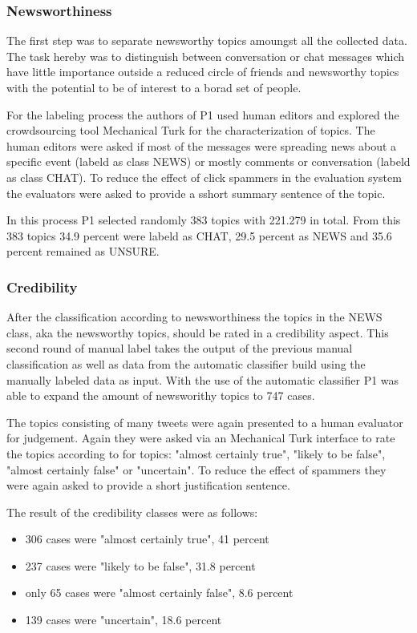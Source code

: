 \documentclass{proseminar}
\begin{document}
\subsubsection*{Newsworthiness}
The first step was to  separate newsworthy topics amoungst all the collected data. The task hereby was to distinguish between conversation or chat messages which have little importance outside a reduced circle of friends and newsworthy topics with the potential to be of interest to a borad set of people.

For the labeling process the authors of P1 used human editors and explored the crowdsourcing tool Mechanical Turk for the characterization of topics.
The human editors were asked if most of the messages were spreading news about a specific event (labeld as class NEWS) or mostly comments or conversation (labeld as class CHAT). To  reduce the effect of click spammers in the evaluation system the evaluators were asked to provide a sshort summary sentence of the topic.

In this process P1 selected randomly 383 topics with 221.279 in total. From this 383 topics 34.9 percent were labeld as CHAT, 29.5 percent as NEWS and 35.6 percent remained as UNSURE.


\subsubsection*{Credibility}
After the classification according to newsworthiness the topics in the NEWS class, aka the newsworthy topics, should be rated in a credibility aspect.
This second round of manual label takes the output of the previous manual classification as well as data from the automatic classifier build using the manually labeled data as input. With the use of the automatic classifier P1 was able to expand the amount of newsworithy topics to 747 cases.

The topics consisting of many tweets were again presented to a human evaluator for judgement. Again they were asked via an Mechanical Turk interface to rate the topics according to for topics: "almost certainly true", "likely to be false", "almost certainly false" or "uncertain". To reduce the effect of spammers they were again asked to provide a short justification sentence. 

The result of the credibility classes were as follows:
\begin{itemize}
\item 306 cases were "almost certainly true", 41 percent
\item 237 cases were "likely to be false", 31.8 percent
\item only 65 cases were "almost certainly false", 8.6 percent
\item 139 cases were "uncertain", 18.6 percent
\end{itemize}
\end{document}
